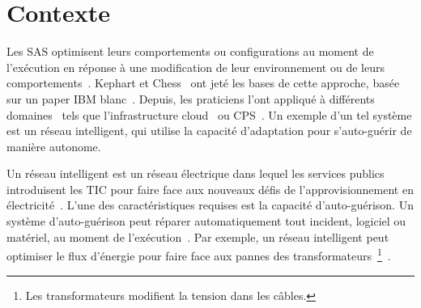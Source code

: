 \section{Contexte}
%
Les SAS optimisent leurs comportements ou configurations au moment de l'exécution en réponse à une modification de leur environnement ou de leurs comportements~\cite{DBLP:conf/dagstuhl/ChengLGIMABBBCSDFGGGKKKLMMMPSTTWW09}. 
Kephart et Chess~\cite{DBLP:journals/computer/KephartC03} ont jeté les bases de cette approche, basée sur un paper IBM blanc~\cite{computing2006architectural}. 
Depuis, les praticiens l'ont appliqué à différents domaines~\cite{DBLP:journals/corr/abs-1904-01518} tels que l'infrastructure cloud~\cite{DBLP:conf/icac/JavadiG17, OpenStack:Watcher:Wiki, DBLP:conf/icse/BarnaKFL17} ou CPS~\cite{DBLP:conf/icac/LalandaGC17, DBLP:conf/cbse/FouquetMFBPJ12, DBLP:conf/smartgridsec/0001FKNT14}. 
Un exemple d'un tel système est un réseau intelligent, qui utilise la capacité d'adaptation pour s'auto-guérir de manière autonome.

%
Un réseau intelligent est un réseau électrique dans lequel les services publics introduisent les TIC pour faire face aux nouveaux défis de l'approvisionnement en électricité~\cite{farhangi2010path, ipakchi2009grid, DBLP:journals/comsur/FangMXY12}. 
L'une des caractéristiques requises est la capacité d'auto-guérison. 
Un système d'auto-guérison peut réparer automatiquement tout incident, logiciel ou matériel, au moment de l'exécution~\cite{DBLP:journals/computer/KephartC03}.
Par exemple, un réseau intelligent peut optimiser le flux d'énergie pour faire face aux pannes des transformateurs~\footnote{Les transformateurs modifient la tension dans les câbles.}~\cite{DBLP:journals/comsur/FangMXY12}.

